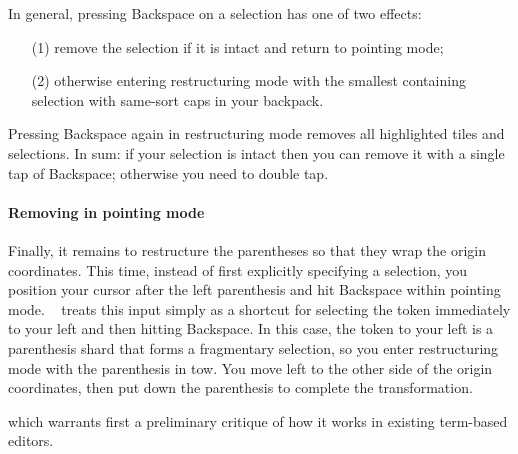 In general, pressing Backspace on a selection
has one of two effects:
\begin{enumerate}
  \item[(1)] remove the selection if it is intact
    and return to pointing mode;
  \item[(2)] otherwise entering restructuring mode with
    the smallest containing selection with same-sort caps
    in your backpack.
\end{enumerate}
Pressing Backspace again in restructuring mode
removes all highlighted tiles and selections.
In sum: if your selection is intact then you can
remove it with a single tap of Backspace; otherwise
you need to double tap.



\paragraph{Removing in pointing mode}
Finally, it remains to restructure the parentheses
so that they wrap the origin coordinates.
This time, instead of first explicitly specifying a selection,
you position your cursor after the left parenthesis
and hit Backspace within pointing mode.
\tylr~ treats this input simply as a shortcut for selecting the
token immediately to your left and then hitting Backspace.
In this case, the token to your left is a parenthesis
shard that forms a fragmentary selection, so you
enter restructuring mode with the parenthesis in tow.
You move left to the other side of the origin coordinates,
then put down the parenthesis to complete the transformation.

\vspace{0.5cm}



which warrants first a preliminary critique of how it
works in existing term-based editors.

